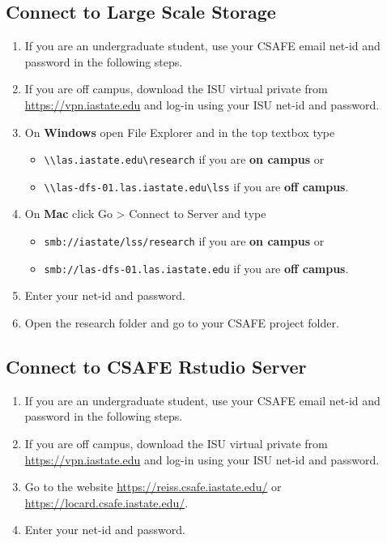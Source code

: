 \documentclass[
]{book}
\providecommand{\tightlist}{%
  \setlength{\itemsep}{0pt}\setlength{\parskip}{0pt}}
\begin{document}
\hypertarget{connect-to-large-scale-storage}{%
\subsection{Connect to Large Scale Storage}\label{connect-to-large-scale-storage}}

\begin{enumerate}
\def\labelenumi{\arabic{enumi}.}
\tightlist
\item
  If you are an undergraduate student, use your CSAFE email net-id and password in the following steps.
\item
  If you are off campus, download the ISU virtual private from \url{https://vpn.iastate.edu} and log-in using your ISU net-id and password.
\item
  On \textbf{Windows} open File Explorer and in the top textbox type

  \begin{itemize}
  \tightlist
  \item
    \texttt{\textbackslash{}\textbackslash{}las.iastate.edu\textbackslash{}research} if you are \textbf{on campus} or
  \item
    \texttt{\textbackslash{}\textbackslash{}las-dfs-01.las.iastate.edu\textbackslash{}lss} if you are \textbf{off campus}.
  \end{itemize}
\item
  On \textbf{Mac} click Go \textgreater{} Connect to Server and type

  \begin{itemize}
  \tightlist
  \item
    \texttt{smb://iastate/lss/research} if you are \textbf{on campus} or
  \item
    \texttt{smb://las-dfs-01.las.iastate.edu} if you are \textbf{off campus}.
  \end{itemize}
\item
  Enter your net-id and password.
\item
  Open the research folder and go to your CSAFE project folder.
\end{enumerate}

\hypertarget{connect-to-csafe-rstudio-server}{%
\subsection{Connect to CSAFE Rstudio Server}\label{connect-to-csafe-rstudio-server}}

\begin{enumerate}
\def\labelenumi{\arabic{enumi}.}
\tightlist
\item
  If you are an undergraduate student, use your CSAFE email net-id and password in the following steps.
\item
  If you are off campus, download the ISU virtual private from \url{https://vpn.iastate.edu} and log-in using your ISU net-id and password.
\item
  Go to the website \url{https://reiss.csafe.iastate.edu/} or \url{https://locard.csafe.iastate.edu/}.
\item
  Enter your net-id and password.
\end{enumerate}
\end{document}
